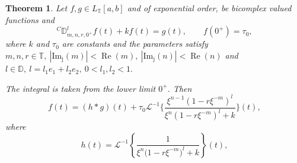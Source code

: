 \documentclass[a4paper,12pt]{article}
\newtheorem{theorem}{Theorem}[section]
\theoremstyle{remark}
\begin{document}
\begin{theorem}\label{th:cauchy-nonhomo}
    Let $f,g\in  L_{\mathbb{T}}[a, b] $ and of exponential order, be bicomplex valued functions and
\begin{equation}\label{cauchy1}
{}^{C}\mathbb{D}^{l}_{m,n,r,0^+} f(t)+kf(t) = g(t), 
\qquad f(0^+) = \tau_0,
\end{equation}
where $k$ and $\tau_0$ are constants and the parameters satisfy 
$m,n,r \in \mathbb{T},~|\operatorname{Im_j}(m)|<\operatorname{Re}(m),~|\operatorname{Im_j}(n)|<\operatorname{Re}(n)$ and $l\in \mathbb{D},~l=l_1e_1+l_2e_2, ~0<l_1,l_2<1.$


The integral is taken from the lower limit $0^+$. Then
\begin{equation}
f(t)= (h *g)(t)+\tau_{0}\mathcal{L}^{-1}\Big\{\frac{\xi^{n-1}(1 - r \xi^{-m})^{l}}{\xi^{n}(1 - r \xi^{-m})^{l} + k}\Big\}(t),
\end{equation}
where 
\[
h(t) = \mathcal{L}^{-1}\left\{\frac{1}{\xi^{n}\big(1 - r\xi^{-m}\big)^{l} + k}\right\}(t),\]

\end{theorem}	
\end{document}
